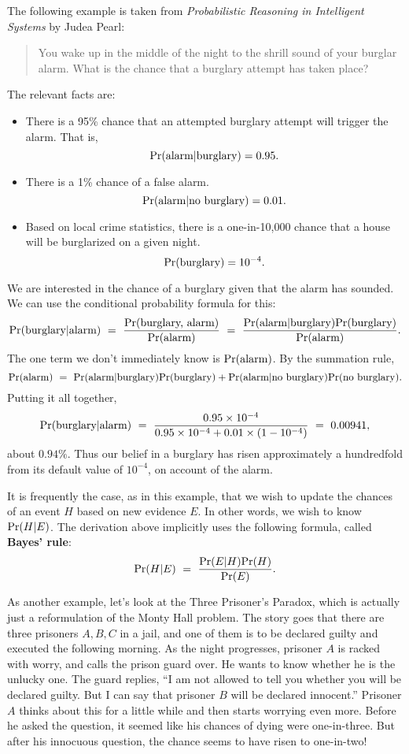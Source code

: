 \documentclass{report}
\theoremstyle{plain}
\theoremstyle{definition}
\newcommand{\pr}{\mbox{\rm Pr}}
\begin{document}
The following example is taken from {\it Probabilistic Reasoning in Intelligent Systems} by Judea Pearl:
\begin{quote}
You wake up in the middle of the night to the shrill sound of your burglar alarm. What is the chance that a burglary attempt has taken place?
\end{quote}
The relevant facts are:
\begin{itemize}
\item There is a 95\% chance that an attempted burglary attempt will trigger the alarm. That is,
$$ \pr(\mbox{alarm} | \mbox{burglary}) = 0.95 .$$
\item There is a 1\% chance of a false alarm.
$$ \pr(\mbox{alarm} | \mbox{no burglary}) = 0.01.$$
\item Based on local crime statistics, there is a one-in-10{,}000 chance that a house will be burglarized on a given night.
$$ \pr(\mbox{burglary}) = 10^{-4}.$$
\end{itemize}
We are interested in the chance of a burglary given that the alarm has sounded. We can use the conditional probability formula for this:
$$ \pr(\mbox{burglary} | \mbox{alarm}) 
\ = \ \frac{\pr(\mbox{burglary, alarm})}{\pr(\mbox{alarm})}
\ = \ \frac{\pr(\mbox{alarm} | \mbox{burglary}) \pr(\mbox{burglary})}{\pr(\mbox{alarm})}
.$$
The one term we don't immediately know is $\pr(\mbox{alarm})$. By the summation rule,
$$ 
\pr(\mbox{alarm}) 
\ = \ 
\pr(\mbox{alarm} | \mbox{burglary}) \pr(\mbox{burglary}) +
\pr(\mbox{alarm} | \mbox{no burglary}) \pr(\mbox{no burglary})
.$$
Putting it all together,
$$ \pr(\mbox{burglary} | \mbox{alarm}) 
\ = \ 
\frac{0.95 \times 10^{-4}}{0.95 \times 10^{-4} + 0.01 \times (1-10^{-4})}
\ = \ 
0.00941,
$$
about $0.94\%$. Thus our belief in a burglary has risen approximately a hundredfold from its default value of $10^{-4}$, on account of the alarm.

It is frequently the case, as in this example, that we wish to update the chances of an event $H$ based on new evidence $E$. In other words, we wish to know $\pr(H | E)$. The derivation above implicitly uses the following formula, called {\bf Bayes' rule}:
$$ \pr(H | E) 
\ = \ 
\frac{\pr(E|H) \pr(H)}{\pr(E)}.
$$  

As another example, let's look at the Three Prisoner's Paradox, which is actually just a reformulation of the Monty Hall problem. The story goes that there are three prisoners $A,B,C$ in a jail, and one of them is to be declared guilty and executed the following morning. As the night progresses, prisoner $A$ is racked with worry, and calls the prison guard over. He wants to know whether he is the unlucky one. The guard replies, ``I am not allowed to tell you whether you will be declared guilty. But I can say that prisoner $B$ will be declared innocent.'' Prisoner $A$ thinks about this for a little while and then starts worrying even more. Before he asked the question, it seemed like his chances of dying were one-in-three. But after his innocuous question, the chance seems to have risen to one-in-two!
\end{document}
